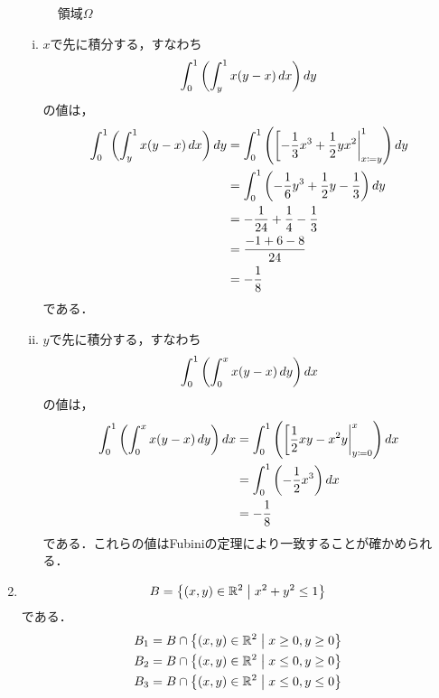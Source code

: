 \begin{enumerate}[(1)]
\begin{figure}[H]
\begin{tikzpicture}[domain=0:1, yscale=2, xscale=2]
        \end{tikzpicture}
        \caption{領域$\Omega$}
        \label{fig:Omega}
    \end{figure}
    \begin{enumerate}[(i)]
        \item $x$で先に積分する，すなわち
        \begin{align}
            \int^1_0\qty(\int^1_y x(y-x)\dd{x})\dd{y}
        \end{align}
        の値は，
        \begin{align}
            \int^1_0\qty(\int^1_y x(y-x)\dd{x})\dd{y}
            &= \int^1_0\qty(\eval[-\frac{1}{3}x^3+\frac{1}{2}yx^2|_{x\coloneqq y}^{1})\dd{y}\\
            &= \int^1_0\qty(-\frac{1}{6}y^3+\frac{1}{2}y-\frac{1}{3})\dd{y}\\
            &= -\frac{1}{24}+\frac{1}{4}-\frac{1}{3}\\
            &= \frac{-1+6-8}{24}\\
            &= -\frac{1}{8}
        \end{align}
        である．
        \item $y$で先に積分する，すなわち
        \begin{align}
            \int^1_0\qty(\int^x_0 x(y-x)\dd{y})\dd{x}
        \end{align}
        の値は，
        \begin{align}
            \int^1_0\qty(\int^x_0 x(y-x)\dd{y})\dd{x}
            &= \int^1_0\qty(\eval[\frac{1}{2}xy-x^2y|_{y \coloneqq 0}^{x})\dd{x}\\
            &= \int^1_0\qty(-\frac{1}{2}x^3)\dd{x}\\
            &= -\frac{1}{8}
        \end{align}
        である．これらの値はFubiniの定理により一致することが確かめられる．
    \end{enumerate}
    \item 
    \begin{equation}
        B=\qty{ (x,y) \in \mathbb{R}^2 \where x^2+y^2\le 1 }
    \end{equation}
    である．
    \begin{align}
        B_1&=B \cap \qty{ (x,y) \in \mathbb{R}^2 \where x \ge 0, y \ge 0 } \\
        B_2&=B \cap \qty{ (x,y) \in \mathbb{R}^2 \where x \le 0, y \ge 0 } \\
        B_3&=B \cap \qty{ (x,y) \in \mathbb{R}^2 \where x \le 0, y \le 0 } \\

\end{align}
\end{enumerate}
